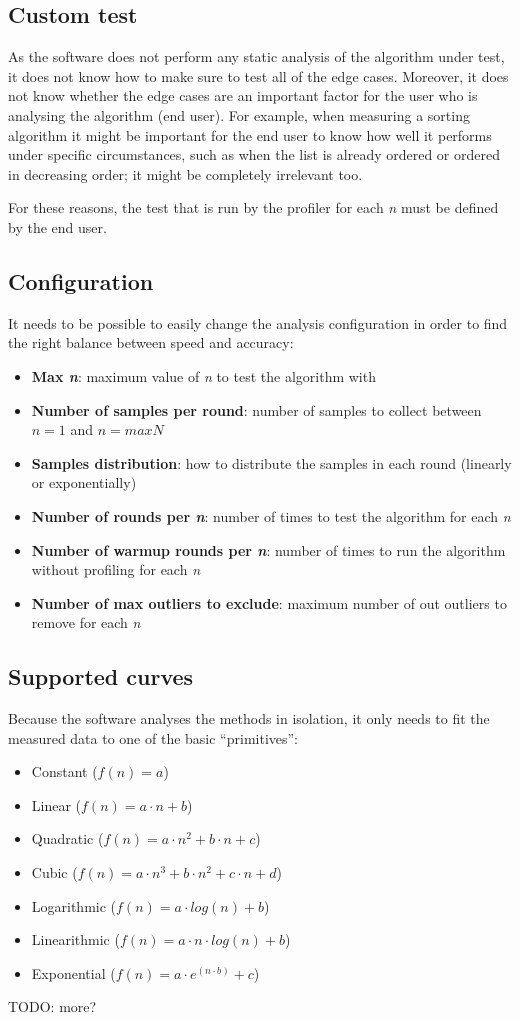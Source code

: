 \subsection{Custom test}
As the software does not perform any static analysis of the algorithm under test, it does not know how to make sure to test all of the edge cases. Moreover, it does not know whether the edge cases are an important factor for the user who is analysing the algorithm (end user). For example, when measuring a sorting algorithm it might be important for the end user to know how well it performs under specific circumstances, such as when the list is already ordered or ordered in decreasing order; it might be completely irrelevant too.

\noindent For these reasons, the test that is run by the profiler for each \emph{n} must be defined by the end user.

\subsection{Configuration}
It needs to be possible to easily change the analysis configuration in order to find the right balance between speed and accuracy:
\begin{itemize}
  \item \textbf{Max \emph{n}}: maximum value of \emph{n} to test the algorithm with
  \item \textbf{Number of samples per round}: number of samples to collect between $n = 1$ and $n = maxN$
  \item \textbf{Samples distribution}: how to distribute the samples in each round (linearly or exponentially)
  \item \textbf{Number of rounds per \emph{n}}: number of times to test the algorithm for each \emph{n}
  \item \textbf{Number of warmup rounds per \emph{n}}: number of times to run the algorithm without profiling for each \emph{n}
  \item \textbf{Number of max outliers to exclude}: maximum number of out outliers to remove for each \emph{n}
\end{itemize}

\subsection{Supported curves}
Because the software analyses the methods in isolation, it only needs to fit the measured data to one of the basic \enquote{primitives}:
\begin{itemize}
  \item Constant ($f(n) = a$)
  \item Linear ($f(n) = a \cdot n + b$)
  \item Quadratic ($f(n) = a \cdot n^2 + b \cdot n + c$)
  \item Cubic ($f(n) = a \cdot n^3 + b \cdot n^2 + c \cdot n + d$)
  \item Logarithmic ($f(n) = a \cdot log(n) + b$)
  \item Linearithmic ($f(n) = a \cdot n \cdot log(n) + b$)
  \item Exponential ($f(n) = a \cdot e^{(n \cdot b)} + c$)
\end{itemize}


\noindent TODO: more?